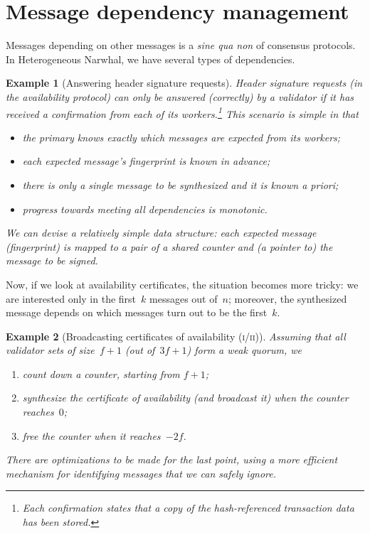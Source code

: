 \documentclass[dvipsnames]{article}
\newtheorem{ex}{Example}[section]
\theoremstyle{definition}
\newcommand{\hn}{Heterogeneous Narwhal\xspace}
\begin{document}
\section{Message dependency management}

Messages depending on other messages
is a \emph{sine qua non} of consensus protocols.
In \hn,
we have several types of dependencies.

\begin{ex}[Answering header signature requests]
  Header signature requests (in the availability protocol)
  can only be answered (correctly) by a validator if
  it has received a confirmation from each of its workers.\footnote{
    Each confirmation states that
    a copy of the hash-referenced transaction data has been stored.
  }
  This scenario is simple in that
  \begin{itemize}
  \item the primary knows exactly %
    which messages are expected from its workers; %
  \item each expected message's fingerprint is \emph{known in advance};
  \item there is only a single message to be synthesized and %
    it is known \emph{a priori}; %
  \item progress towards meeting all dependencies is monotonic.
  \end{itemize}
  We can devise a relatively simple data structure:
  each expected message (fingerprint) is mapped to a pair of
  a shared counter and (a pointer to) the message to be signed. 
\end{ex}

Now, if we look at availability certificates,
the situation becomes more tricky:
we are interested only in the first \(k\) messages out of \(n\);
moreover, 
the synthesized message depends on which messages turn out to be 
the first \(k\). 

\begin{ex}[Broadcasting certificates of availability (\textsc{i/ii})]
  Assuming that all validator sets of size~\(f+1\) (out of~\(3f+1\))
  form a weak quorum, we
  \begin{enumerate}
  \item count down a counter, starting from \(f+1\);
  \item synthesize the certificate of availability (and broadcast it)
    when the counter reaches \(0\);
  \item free the counter when it reaches~\(-2f\).
  \end{enumerate}
  There are optimizations to be made for the last point, 
  using a more efficient mechanism for identifying 
  messages that we can safely ignore. 
\end{ex}
\end{document}
